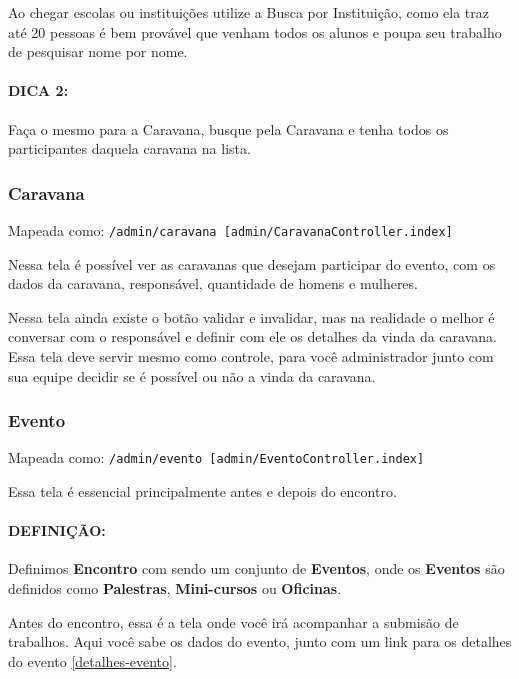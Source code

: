 Ao chegar escolas ou instituições utilize a Busca por Instituição, como
ela traz até 20 pessoas é bem provável que venham todos os alunos e
poupa seu trabalho de pesquisar nome por nome.

\paragraph{DICA 2:}

Faça o mesmo para a Caravana, busque pela Caravana e tenha todos os
participantes daquela caravana na lista.

\subsubsection{Caravana \label{caravana}}

Mapeada como:
\texttt{/admin/caravana {[}admin/CaravanaController.index{]}}

Nessa tela é possível ver as caravanas que desejam participar do evento,
com os dados da caravana, responsável, quantidade de homens e mulheres.

Nessa tela ainda existe o botão validar e invalidar, mas na realidade o
melhor é conversar com o responsável e definir com ele os detalhes da
vinda da caravana. Essa tela deve servir mesmo como controle, para você
administrador junto com sua equipe decidir se é possível ou não a vinda
da caravana.

\subsubsection{Evento \label{evento}}

Mapeada como: \texttt{/admin/evento {[}admin/EventoController.index{]}}

Essa tela é essencial principalmente antes e depois do encontro.

\paragraph{DEFINIÇÃO:}

Definimos \textbf{Encontro} com sendo um conjunto de \textbf{Eventos},
onde os \textbf{Eventos} são definidos como \textbf{Palestras},
\textbf{Mini-cursos} ou \textbf{Oficinas}.

\bigskip

Antes do encontro, essa é a tela onde você irá acompanhar a submisão de
trabalhos. Aqui você sabe os dados do evento, junto com um link para os
detalhes do evento \ref{detalhes-evento}.

